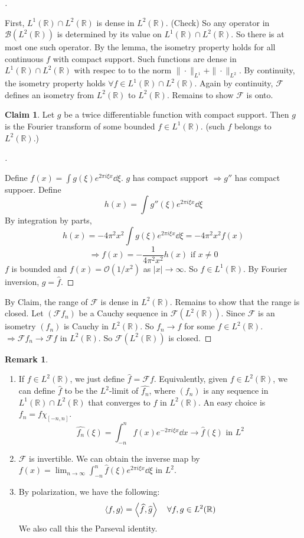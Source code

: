 \documentclass{article}
\theoremstyle{definition}
\newtheorem{rem}{Remark}
\newtheorem*{clm}{Claim}
\newenvironment{proofs}[1][\proofname]{%
  \begin{proof}[#1]$ $\par\nobreak\ignorespaces
}{%
  \end{proof}
}
\newcommand{\B}{\mathcal B}
\newcommand{\F}{\mathcal F}
\renewcommand{\O}{\mathcal O}
\newcommand{\RR}{\mathbb R}
\newcommand{\Ra}{\Rightarrow}
\begin{document}
\begin{proofs}
	First, $L^1(\RR) \cap L^2(\RR)$ is dense in $L^2(\RR)$. (Check)
	So any operator in $\B(L^2(\RR))$ is determined by its value on $L^1(\RR) \cap L^2(\RR)$.
	So there is at most one such operator.
	By the lemma, the isometry property holds for all continuous $f$ with compact support.
	Such functions are dense in $L^1(\RR) \cap L^2(\RR)$ with respec to to the norm $\|\cdot\|_{L^1} + \|\cdot\|_{L^2}$.
	By continuity, the isometry property holds $\forall f \in L^1(\RR) \cap L^2(\RR)$.
	Again by continuity, $\F$ defines an isometry from $L^2(\RR)$ to $L^2(\RR)$.
	Remains to show $\F$ is onto.
	\begin{clm}
		Let $g$ be a twice differentiable function with compact support.
		Then $g$ is the Fourier transform of some bounded $f \in L^1(\RR)$.
		(such $f$ belongs to $L^2(\RR)$.)
	\end{clm}

	\begin{proofs}
		Define $f(x) = \int g(\xi) e^{2 \pi i \xi x} \dd{\xi}$.
		$g$ has compact support $\Ra g''$ has compact suppoer.
		Define 
		\[
			h(x) = \int g''(\xi)e^{2 \pi i \xi x} \dd{\xi}
		\]
		By integration by parts, 
		\[
			h(x) = - 4 \pi^2 x^2 \int g(\xi) e^{2 \pi i \xi x} \dd{\xi} = -4 \pi^2 x^2 f(x)
		\]
		\[
			\Ra f(x) = -\frac{1}{4 \pi^2 x^2} h(x) \text{ if }x \neq 0
		\]
		$f$ is bounded and $f(x) = \O(1/x^2)$ as $|x| \to \infty$.
		So $f \in L^1(\RR)$.
		By Fourier inversion, $g = \widehat{f}$.
	\end{proofs}
	By Claim, the range of $\F$ is dense in $L^2(\RR)$.
	Remains to show that the range is closed.
	Let $(\F f_n)$ be a Cauchy sequence in $\F(L^2(\RR))$.
	Since $\F$ is an isometry $(f_n)$ is Cauchy in $L^2(\RR)$.
	So $f_n \to f$ for some $f \in L^2(\RR)$.
	$\Ra \F f_n \to \F f$ in $L^2(\RR)$.
	So $\F(L^2(\RR))$ is closed.
\end{proofs}

\begin{rem}
	$ $\par\nobreak\ignorespaces
	\begin{enumerate}
		\item If $f \in L^2(\RR)$, we just define $\widehat{f} = \F f$.
			Equivalently, given $f \in L^2(\RR)$, we can define $\widehat{f}$ to be the $L^2$-limit of $\widehat{f_n}$, where $(f_n)$ is any sequence in $L^1(\RR) \cap L^2(\RR)$ that converges to $f$ in $L^2(\RR)$.
			An easy choice is $f_n = f \chi_{[-n, n]}$.
			\[
				\widehat{f_n}(\xi) = \int_{-n}^n f(x) e^{-2 \pi i \xi x} \dd{x} \to \widehat{f}(\xi) \text{ in } L^2
			\]

		\item $\F$ is invertible.
			We can obtain the inverse map by $f(x) = \lim_{n \to \infty} \int_{-n}^n \widehat{f}(\xi) e^{2 \pi i \xi x} \dd{\xi}$ in $L^2$.

		\item By polarization, we have the following:
			\[
				\ev{f, g} = \ev{\widehat{f}, \widehat{g}} \quad \forall f, g \in L^2(\RR)
			\]
			We also call this the Parseval identity.
	\end{enumerate}
\end{rem}
\end{document}
